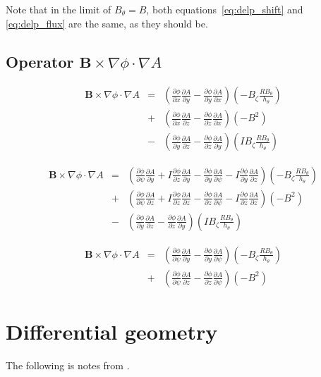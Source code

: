 \documentclass[12pt]{article}
\newcommand{\deriv}[2]{\ensuremath{\frac{\partial #1}{\partial #2}}}
\newcommand{\hthe}{\ensuremath{h_\theta}}
\newcommand{\Bp}{\ensuremath{B_\theta}}
\newcommand{\Bt}{\ensuremath{B_\zeta}}
\newcommand{\Vec}[1]{\ensuremath{\mathbf{#1}}}
\newcommand{\Bvec}{\Vec{B}}
\newcommand{\rbp}{\ensuremath{R\Bp}}
\begin{document}
Note that in the limit of $B_\theta = B$, both equations~\ref{eq:delp_shift} and \ref{eq:delp_flux} are the same, as they should be.

\subsection{Operator $\Bvec\times\nabla\phi\cdot\nabla A$}

\begin{eqnarray*}
\Bvec\times\nabla\phi\cdot\nabla A &=& \left(\deriv{\phi}{x}\deriv{A}{y} - \deriv{\phi}{y}\deriv{A}{x}\right)\left(-\Bt\frac{\rbp}{\hthe}\right) \\
&+& \left(\deriv{\phi}{x}\deriv{A}{z} - \deriv{\phi}{z}\deriv{A}{x}\right)\left(-B^2\right) \\
&-& \left(\deriv{\phi}{y}\deriv{A}{z} - \deriv{\phi}{z}\deriv{A}{y}\right)\left(I\Bt\frac{\rbp}{\hthe}\right)
\end{eqnarray*}

\begin{eqnarray*}
\Bvec\times\nabla\phi\cdot\nabla A &=& \left(\deriv{\phi}{\psi}\deriv{A}{y} + I \deriv{\phi}{z}\deriv{A}{y} - \deriv{\phi}{y}\deriv{A}{\psi} - I\deriv{\phi}{y}\deriv{A}{z}\right)\left(-\Bt\frac{\rbp}{\hthe}\right) \\
&+& \left(\deriv{\phi}{\psi}\deriv{A}{z} + I\deriv{\phi}{z}\deriv{A}{z} - \deriv{\phi}{z}\deriv{A}{\psi} - I\deriv{\phi}{z}\deriv{A}{z}\right)\left(-B^2\right) \\
&-& \left(\deriv{\phi}{y}\deriv{A}{z} - \deriv{\phi}{z}\deriv{A}{y}\right)\left(I\Bt\frac{\rbp}{\hthe}\right)
\end{eqnarray*}

\begin{eqnarray}
\Bvec\times\nabla\phi\cdot\nabla A &=& \left(\deriv{\phi}{\psi}\deriv{A}{y} - \deriv{\phi}{y}\deriv{A}{\psi}\right)\left(-\Bt\frac{\rbp}{\hthe}\right) \nonumber \\
&+& \left(\deriv{\phi}{\psi}\deriv{A}{z} - \deriv{\phi}{z}\deriv{A}{\psi} \right)\left(-B^2\right)
\end{eqnarray}




\appendix

\section{Differential geometry}

The following is notes from \cite{hazeltine-2003}.
\end{document}
